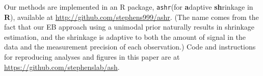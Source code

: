 \documentclass[11pt]{article}
\def\ashr{{\tt ashr}\xspace}
\begin{document}
Our methods are implemented in an R package, \ashr (for {\bf a}daptive {\bf sh}rinkage in {\bf R}), available at 
\url{http://github.com/stephens999/ashr}.
(The name comes from the fact that our EB approach using a unimodal prior naturally results in shrinkage estimation,
and the shrinkage is adaptive to both the amount of signal in the data and the measurement precision of each observation.) 
Code and instructions for reproducing analyses and figures in this paper are at
\url{https://github.com/stephenslab/ash}.



%

\end{document}
